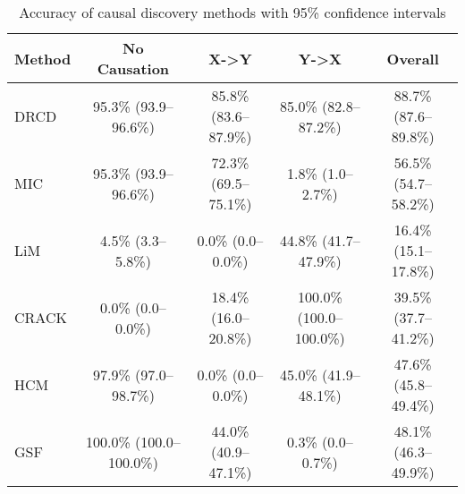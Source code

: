 \begin{table}[htbp]
\centering
\caption{Accuracy of causal discovery methods with 95\% confidence intervals}
\begin{tabular}{lcccc}
\toprule
Method & No Causation & X->Y & Y->X & Overall \\
\midrule
DRCD & 95.3\% (93.9--96.6\%) & 85.8\% (83.6--87.9\%) & 85.0\% (82.8--87.2\%) & 88.7\% (87.6--89.8\%) \\
MIC & 95.3\% (93.9--96.6\%) & 72.3\% (69.5--75.1\%) & 1.8\% (1.0--2.7\%) & 56.5\% (54.7--58.2\%) \\
LiM & 4.5\% (3.3--5.8\%) & 0.0\% (0.0--0.0\%) & 44.8\% (41.7--47.9\%) & 16.4\% (15.1--17.8\%) \\
CRACK & 0.0\% (0.0--0.0\%) & 18.4\% (16.0--20.8\%) & 100.0\% (100.0--100.0\%) & 39.5\% (37.7--41.2\%) \\
HCM & 97.9\% (97.0--98.7\%) & 0.0\% (0.0--0.0\%) & 45.0\% (41.9--48.1\%) & 47.6\% (45.8--49.4\%) \\
GSF & 100.0\% (100.0--100.0\%) & 44.0\% (40.9--47.1\%) & 0.3\% (0.0--0.7\%) & 48.1\% (46.3--49.9\%) \\
\bottomrule
\end{tabular}
\label{tab:accuracy_results}
\end{table}
